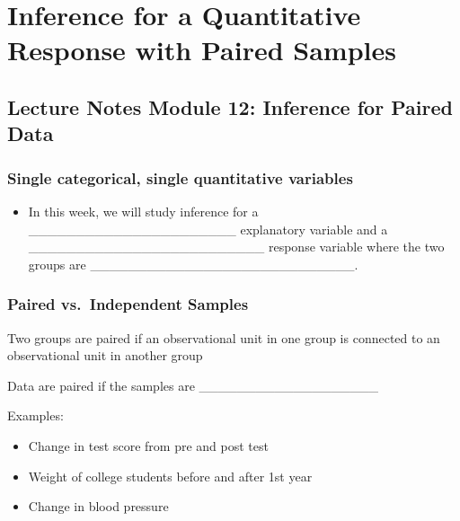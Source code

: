 \documentclass[
]{report}
\providecommand{\tightlist}{%
  \setlength{\itemsep}{0pt}\setlength{\parskip}{0pt}}
\newcommand{\rgi}{\hspace{24pt}}  %
\begin{document}
\newpage

\hypertarget{inference-for-a-quantitative-response-with-paired-samples}{%
\chapter{Inference for a Quantitative Response with Paired Samples}\label{inference-for-a-quantitative-response-with-paired-samples}}

\hypertarget{lecture-notes-module-12-inference-for-paired-data}{%
\section{Lecture Notes Module 12: Inference for Paired Data}\label{lecture-notes-module-12-inference-for-paired-data}}


\hypertarget{single-categorical-single-quantitative-variables}{%
\subsection*{Single categorical, single quantitative variables}\label{single-categorical-single-quantitative-variables}}

\begin{itemize}
\tightlist
\item
  In this week, we will study inference for a \_\_\_\_\_\_\_\_\_\_\_\_\_\_\_\_\_\_\_\_\_\_ explanatory variable and a \_\_\_\_\_\_\_\_\_\_\_\_\_\_\_\_\_\_\_\_\_\_\_\_\_ response variable where the two groups are \_\_\_\_\_\_\_\_\_\_\_\_\_\_\_\_\_\_\_\_\_\_\_\_\_\_\_\_.
\end{itemize}

\hypertarget{paired-vs.-independent-samples}{%
\subsection*{Paired vs.~Independent Samples}\label{paired-vs.-independent-samples}}

Two groups are paired if an observational unit in one group is connected to an observational unit in another group

\rgi Data are paired if the samples are \_\_\_\_\_\_\_\_\_\_\_\_\_\_\_\_\_\_\_

Examples:

\begin{itemize}
\item
  Change in test score from pre and post test
\item
  Weight of college students before and after 1st year
\item
  Change in blood pressure
\end{itemize}
\end{document}
